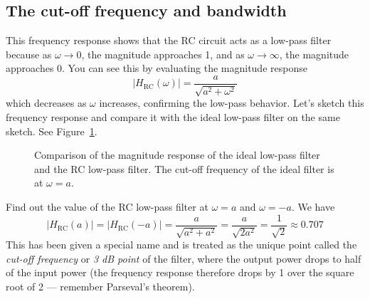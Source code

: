 \subsection{The cut-off frequency and bandwidth}
This frequency response shows that the RC circuit acts as a low-pass filter because as $\omega \to 0$, the magnitude approaches 1, and as $\omega \to \infty$, the magnitude approaches 0. You can see this by evaluating the magnitude response
\[
|H_{\text{RC}}(\omega)| = \frac{a}{\sqrt{a^2 + \omega^2}}
\]
which decreases as $\omega$ increases, confirming the low-pass behavior. Let's sketch this frequency response and compare it with the ideal low-pass filter on the same sketch. See Figure~\ref{fig:impulse_response_comparison}.
\begin{figure}[h]
    \centering 

    \caption{Comparison of the magnitude response of the ideal low-pass filter and the RC low-pass filter. The cut-off frequency of the ideal filter is at $\omega = a$.}
    \label{fig:impulse_response_comparison}
\end{figure}

Find out the value of the RC low-pass filter at $\omega = a$ and $\omega = -a$. We have 
\[
|H_{\text{RC}}(a)| = |H_{\text{RC}}(-a)| = \frac{a}{\sqrt{a^2 + a^2}} = \frac{a}{\sqrt{2a^2}} = \frac{1}{\sqrt{2}} \approx 0.707
\]
This has been given a special name and is treated as the unique point called the \textit{cut-off frequency} or \textit{3 dB point} of the filter, where the output power drops to half of the input power (the frequency response therefore drops by 1 over the square root of 2 --- remember Parseval's theorem).

